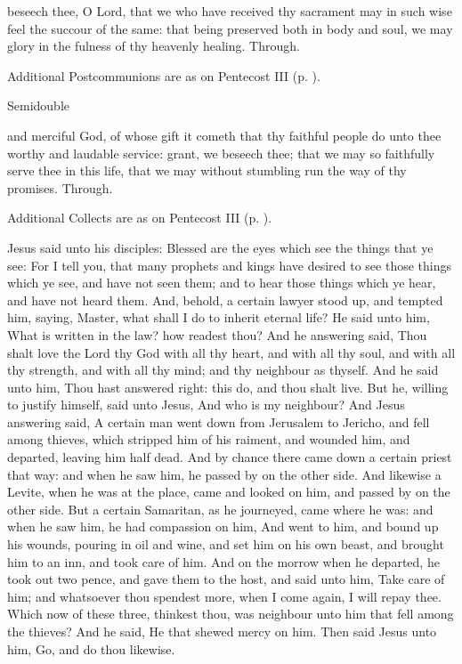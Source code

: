\postcommunion
{} beseech thee, O Lord, that we who have received thy sacrament may in such wise feel the succour of the same: that being preserved both in body and soul, we may glory in the fulness of thy heavenly healing. Through.
\begin{rubric}
    Additional Postcommunions are as on Pentecost III (p. \pageref{PentecostIII}).
\end{rubric}

\begin{inhead}
{Semidouble}
\end{inhead}

\collect
{} and merciful God, of whose gift it cometh that thy faithful people do unto thee worthy and laudable service: grant, we beseech thee; that we may so faithfully serve thee in this life, that we may without stumbling run the way of thy promises. Through.
\begin{rubric}
    Additional Collects are as on Pentecost III (p. \pageref{PentecostIII}).
\end{rubric}

 Jesus said unto his disciples: Blessed are the eyes which see the things that ye see: For I tell you, that many prophets and kings have desired to see those things which ye see, and have not seen them; and to hear those things which ye hear, and have not heard them. And, behold, a certain lawyer stood up, and tempted him, saying, Master, what shall I do to inherit eternal life? He said unto him, What is written in the law? how readest thou? And he answering said, Thou shalt love the Lord thy God with all thy heart, and with all thy soul, and with all thy strength, and with all thy mind; and thy neighbour as thyself. And he said unto him, Thou hast answered right: this do, and thou shalt live. But he, willing to justify himself, said unto Jesus, And who is my neighbour? And Jesus answering said, A certain man went down from Jerusalem to Jericho, and fell among thieves, which stripped him of his raiment, and wounded him, and departed, leaving him half dead. And by chance there came down a certain priest that way: and when he saw him, he passed by on the other side. And likewise a Levite, when he was at the place, came and looked on him, and passed by on the other side. But a certain Samaritan, as he journeyed, came where he was: and when he saw him, he had compassion on him, And went to him, and bound up his wounds, pouring in oil and wine, and set him on his own beast, and brought him to an inn, and took care of him. And on the morrow when he departed, he took out two pence, and gave them to the host, and said unto him, Take care of him; and whatsoever thou spendest more, when I come again, I will repay thee. Which now of these three, thinkest thou, was neighbour unto him that fell among the thieves? And he said, He that shewed mercy on him. Then said Jesus unto him, Go, and do thou likewise.

